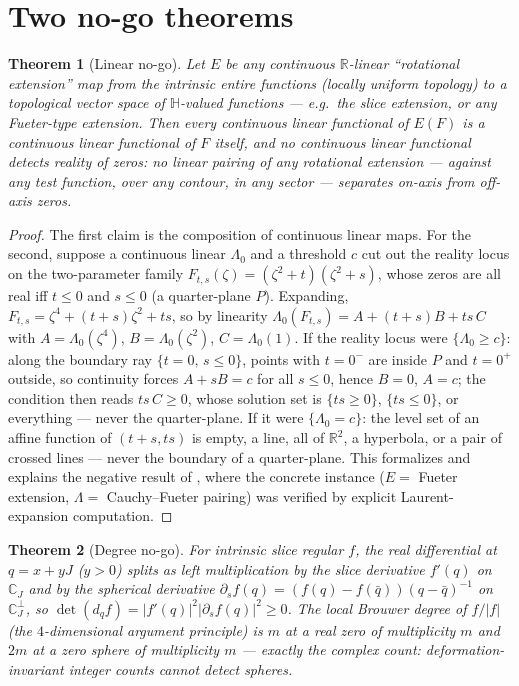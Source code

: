 \documentclass[11pt]{amsart}
\theoremstyle{plain}
\newtheorem{mainthm}{Theorem}
\theoremstyle{definition}
\theoremstyle{remark}
\newcommand{\HH}{\mathbb{H}}
\newcommand{\CC}{\mathbb{C}}
\newcommand{\RR}{\mathbb{R}}
\begin{document}
\section{Two no-go theorems}\label{sec:nogo}

\begin{mainthm}[Linear no-go]\label{thm:D}
Let $E$ be any continuous $\RR$-linear ``rotational extension'' map from the intrinsic entire
functions (locally uniform topology) to a topological vector space of $\HH$-valued functions ---
e.g.\ the slice extension, or any Fueter-type extension.
Then every continuous linear functional of $E(F)$ is a continuous linear functional of $F$ itself,
and no continuous linear functional detects reality of zeros: no linear pairing of any rotational
extension --- against any test function, over any contour, in any sector --- separates on-axis from
off-axis zeros.
\end{mainthm}

\begin{proof}
The first claim is the composition of continuous linear maps. For the second, suppose a
continuous linear $\Lambda_0$ and a threshold $c$ cut out the reality locus on the two-parameter
family $F_{t,s}(\zeta)=(\zeta^2+t)(\zeta^2+s)$, whose zeros are all real iff $t\le0$ and $s\le0$
(a quarter-plane $P$). Expanding, $F_{t,s}=\zeta^4+(t+s)\zeta^2+ts$, so by linearity
$\Lambda_0(F_{t,s})=A+(t+s)B+ts\,C$ with $A=\Lambda_0(\zeta^4)$, $B=\Lambda_0(\zeta^2)$,
$C=\Lambda_0(1)$. If the reality locus were $\{\Lambda_0\ge c\}$: along the boundary ray
$\{t=0,\,s\le0\}$, points with $t=0^-$ are inside $P$ and $t=0^+$ outside, so continuity forces
$A+sB=c$ for all $s\le0$, hence $B=0$, $A=c$; the condition then reads $ts\,C\ge0$, whose
solution set is $\{ts\ge0\}$, $\{ts\le0\}$, or everything --- never the quarter-plane. If it
were $\{\Lambda_0=c\}$: the level set of an affine function of $(t+s,ts)$ is empty, a line, all
of $\RR^2$, a hyperbola, or a pair of crossed lines --- never the boundary of a quarter-plane.
This formalizes and explains the negative result of \cite[\S4]{Baker2015}, where the concrete
instance ($E=$ Fueter extension, $\Lambda=$ Cauchy--Fueter pairing) was verified by explicit
Laurent-expansion computation.
\end{proof}

\begin{mainthm}[Degree no-go]\label{thm:E}
For intrinsic slice regular $f$, the real differential at $q=x+yJ$ ($y>0$) splits as left
multiplication by the slice derivative $f'(q)$ on $\CC_J$ and by the spherical derivative
$\partial_sf(q)=(f(q)-f(\bar q))(q-\bar q)^{-1}$ on $\CC_J^\perp$, so
$\det(d_qf)=|f'(q)|^2|\partial_sf(q)|^2\ge0$. The local Brouwer degree of $f/|f|$ (the
$4$-dimensional argument principle) is $m$ at a real zero of multiplicity $m$ and $2m$ at a zero
sphere of multiplicity $m$ --- exactly the complex count: deformation-invariant integer counts
cannot detect spheres.
\end{mainthm}
\end{document}
